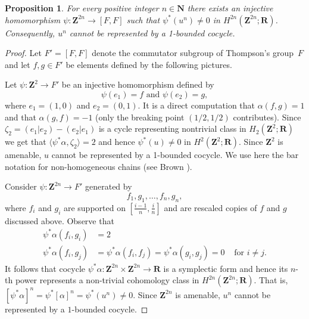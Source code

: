 \documentclass[12pt,reqno,a4paper]{amsart}
\newtheorem{proposition}[subsection]{Proposition}
\theoremstyle{definition}
\theoremstyle{remark}
\numberwithin{equation}{section}
\numberwithin{figure}{section}
\newcommand{\B}[1]{{\mathbf #1}}
\begin{document}
\begin{proposition}\label{P:thompson}
For every positive integer $n\in \B N$ there exists an injective homomorphism
$\psi\colon \B Z^{2n}\to [F,F]$ such that $\psi^*(u^n)\neq 0$
in $H^{2n}(\B Z^{2n};\B R)$. Consequently, $u^n$ cannot be represented
by a 1-bounded cocycle.
\end{proposition}

\begin{proof}
Let $F'=[F,F]$ denote the commutator subgroup of Thompson's group~$F$
and let $f,g\in F'$ be elements defined by the following pictures.
\begin{center}
\end{center}
Let $\psi\colon \B Z^2\to F'$ be an injective homomorphism defined by 
$$
\psi(e_1)=f\text { and } \psi(e_2)=g,
$$
where $e_1=(1,0)$ and $e_2=(0,1)$.  It is a direct computation that
$\alpha(f,g)=1$ and that $\alpha(g,f)=-1$ (only the breaking point $(1/2,1/2)$
contributes). Since $\zeta_2 = (e_1|e_2)-(e_2|e_1)$ is a cycle representing
nontrivial class in $H_2(\B Z^2;\B R)$ we get that 
$\langle \psi^*\alpha,\zeta_2\rangle=2$ and hence $\psi^*(u)\neq 0$ in $H^2(\B Z^2;\B R)$.
Since $\B Z^2$ is amenable, $u$ cannot be represented by a 1-bounded cocycle.
We use here the bar notation for non-homogeneous chains 
(see Brown \cite[Section II.3]{zbMATH03935317}).


Consider $\psi\colon \B Z^{2n}\to F'$ generated by
$$
f_1,g_1,\ldots,f_n,g_n,
$$
where $f_i$ and $g_i$ are supported on $\left[ \frac{i-1}{n},\frac{i}{n} \right]$
and are rescaled copies of $f$ and $g$ discussed above. Observe that
\begin{align*}
\psi^*\alpha(f_i,g_i) &= 2\\
\psi^*\alpha(f_i,g_j) &= 
\psi^*\alpha(f_i,f_j) = 
\psi^*\alpha(g_i,g_j) = 0 &\text{ for $i\neq j$}. 
\end{align*}
It follows that cocycle $\psi^*\alpha\colon \B Z^{2n}\times \B Z^{2n}\to \B R$ is
a symplectic form and hence its $n$-th power represents a non-trivial
cohomology class in $H^{2n}(\B Z^{2n};\B R)$. That is, $[\psi^*\alpha]^n=
\psi^*[\alpha]^n=\psi^*(u^n)\neq 0$. Since $\B Z^{2n}$ is amenable, $u^n$ cannot
be represented by a $1$-bounded cocycle.
\end{proof}
\end{document}
